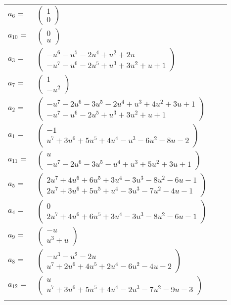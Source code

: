 \documentclass[1p]{elsarticle_modified}
\theoremstyle{definition}
\begin{document}
\begin{tabular}{m{7pt} m{180pt} m{7pt} m{180pt} }
\flushright $a_{6}=$&$\begin{pmatrix}1\\0\end{pmatrix}$ \\
\flushright $a_{10}=$&$\begin{pmatrix}0\\u\end{pmatrix}$ \\
\flushright $a_{3}=$&$\begin{pmatrix}- u^6- u^5-2 u^4+u^2+2 u\\- u^7- u^6-2 u^5+u^3+3 u^2+u+1\end{pmatrix}$ \\
\flushright $a_{7}=$&$\begin{pmatrix}1\\- u^2\end{pmatrix}$ \\
\flushright $a_{2}=$&$\begin{pmatrix}- u^7-2 u^6-3 u^5-2 u^4+u^3+4 u^2+3 u+1\\- u^7- u^6-2 u^5+u^3+3 u^2+u+1\end{pmatrix}$ \\
\flushright $a_{1}=$&$\begin{pmatrix}-1\\u^7+3 u^6+5 u^5+4 u^4- u^3-6 u^2-8 u-2\end{pmatrix}$ \\
\flushright $a_{11}=$&$\begin{pmatrix}u\\- u^7-2 u^6-3 u^5- u^4+u^3+5 u^2+3 u+1\end{pmatrix}$ \\
\flushright $a_{5}=$&$\begin{pmatrix}2 u^7+4 u^6+6 u^5+3 u^4-3 u^3-8 u^2-6 u-1\\2 u^7+3 u^6+5 u^5+u^4-3 u^3-7 u^2-4 u-1\end{pmatrix}$ \\
\flushright $a_{4}=$&$\begin{pmatrix}0\\2 u^7+4 u^6+6 u^5+3 u^4-3 u^3-8 u^2-6 u-1\end{pmatrix}$ \\
\flushright $a_{9}=$&$\begin{pmatrix}- u\\u^3+u\end{pmatrix}$ \\
\flushright $a_{8}=$&$\begin{pmatrix}- u^3- u^2-2 u\\u^7+2 u^6+4 u^5+2 u^4-6 u^2-4 u-2\end{pmatrix}$ \\
\flushright $a_{12}=$&$\begin{pmatrix}u\\u^7+3 u^6+5 u^5+4 u^4-2 u^3-7 u^2-9 u-3\end{pmatrix}$\\&\end{tabular}
\end{document}
